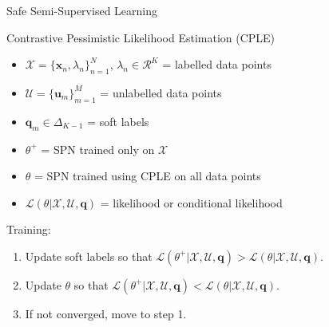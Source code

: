 \begin{frame}{Safe Semi-Supervised Learning}{}
    \begin{block}{Contrastive Pessimistic Likelihood Estimation (CPLE)}
        \begin{itemize}
            \item $\mathcal{X} = \{\bm x_n, \lambda_n\}_{n=1}^N$, $\lambda_n \in \mathcal{R}^K$  = labelled data points
            \item $\mathcal{U} = \{\bm u_m\}_{m=1}^M$ = unlabelled data points
            \item $\bm q_m \in \Delta_{K-1}$ = soft labels
            \item $\theta^+$ = SPN trained only on $\mathcal{X}$
            \item $\theta$ = SPN trained using CPLE on all data points
            \item $\mathcal{L}(\theta | \mathcal{X}, \mathcal{U}, \bm q)$ = likelihood or conditional likelihood
        \end{itemize}

    \pause
    Training:
    \begin{enumerate}
        \item Update soft labels so that $\mathcal{L}(\theta^+ | \mathcal{X}, \mathcal{U}, \bm q) > \mathcal{L}(\theta | \mathcal{X}, \mathcal{U}, \bm q)$.
        \item Update $\theta$ so that $\mathcal{L}(\theta^+ | \mathcal{X}, \mathcal{U}, \bm q) < \mathcal{L}(\theta | \mathcal{X}, \mathcal{U}, \bm q)$.
        \item If not converged, move to step 1.
    \end{enumerate}

\end{block}
\end{frame}


